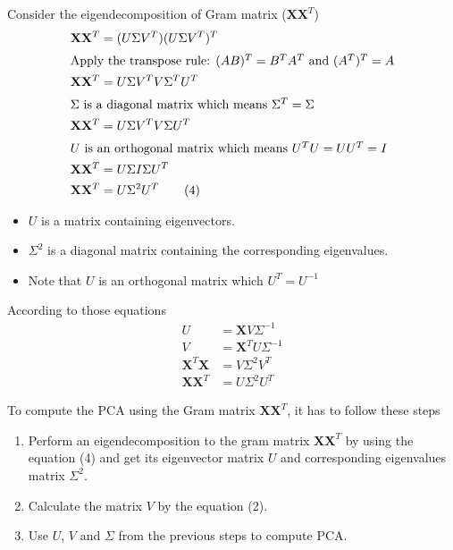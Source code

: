 \documentclass[12pt, a4paper]{article}
\begin{document}
            \noindent Consider the eigendecomposition of Gram matrix ($\mathbf{X} \mathbf{X}^T$)
            \begin{align*}
                \mathbf{X} \mathbf{X}^T &= (U \Sigma V^T) (U \Sigma V^T)^T \\
                \intertext{Apply the transpose rule: $(AB)^T = B^T A^T$ and $(A^T)^T = A$}
                \mathbf{X} \mathbf{X}^T &= U \Sigma V^T V \Sigma^T U^T \\
                \intertext{$\Sigma$ is a diagonal matrix which means $\Sigma^T = \Sigma$}
                \mathbf{X} \mathbf{X}^T &= U \Sigma V^T V \Sigma U^T \\
                \intertext{$U$ is an orthogonal matrix which means $U^T U = U U^T = I$}
                \mathbf{X} \mathbf{X}^T &= U \Sigma I \Sigma U^T \\
                \mathbf{X} \mathbf{X}^T &= U \Sigma^2 U^T \tag{4}
            \end{align*}
            \begin{itemize}
                \item $U$ is a matrix containing eigenvectors.
                \item $\Sigma^2$ is a diagonal matrix containing the corresponding eigenvalues.
                \item Note that $U$ is an orthogonal matrix which $U^T = U^{-1}$
            \end{itemize}

    \pagebreak

        \noindent According to those equations
        \begin{align*}
            U &= \mathbf{X} V {\Sigma}^{-1} \tag{1} \\
            V &= \mathbf{X}^T U \Sigma^{-1} \tag{2} \\
            \mathbf{X}^T \mathbf{X} &= V \Sigma^2 V^T \tag{3} \\
            \mathbf{X} \mathbf{X}^T &= U \Sigma^2 U^T \tag{4}
        \end{align*}

        \noindent To compute the PCA using the Gram matrix $\mathbf{X} \mathbf{X}^T$, it has to follow these steps
        \begin{enumerate}
            \item Perform an eigendecomposition to the gram matrix $\mathbf{X} \mathbf{X}^T$ by using the equation (4)
            and get its eigenvector matrix $U$ and corresponding eigenvalues matrix $\Sigma^2$.
            \item Calculate the matrix $V$ by the equation (2).
            \item Use $U$, $V$ and $\Sigma$ from the previous steps to compute PCA.
        \end{enumerate}
\end{document}
